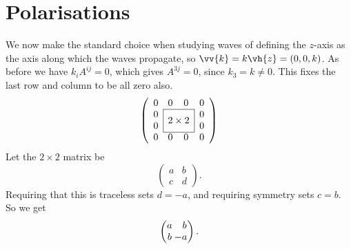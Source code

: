 \documentclass[fleqn]{NotesClass}
\begin{document}
    \section{Polarisations}
    We now make the standard choice when studying waves of defining the \(z\)-axis as the axis along which the waves propagate, so \(\vv{k} = k\vh{z} = (0, 0, k)\).
    As before we have \(k_iA^{ij} = 0\), which gives \(A^{3j} = 0\), since \(k_3 = k \ne 0\).
    This fixes the last row and column to be all zero also.
    \begin{equation}
        \left(
        \begin{array}{cccc}
            0 & 0 & 0 & 0\\\cline{2-3}
            0 & \multicolumn{1}{|c}{} & \multicolumn{1}{c|}{} & 0\\
            0 & \multicolumn{1}{|c}{} &  \multicolumn{1}{c|}{\hspace{-1.5em}\smash{{\raisebox{1.3ex}{\(2\times 2\)}}}} & 0\\\cline{2-3}
            0 & 0 & 0 & 0\\
        \end{array}
        \right)
    \end{equation}
    Let the \(2\times 2\) matrix be
    \begin{equation}
        \begin{pmatrix}
            a & b\\
            c & d
        \end{pmatrix}
        .
    \end{equation}
    Requiring that this is traceless sets \(d = -a\), and requiring symmetry sets \(c = b\).
    So we get
    \begin{equation}
        \begin{pmatrix}
            a & b\\
            b & \mathllap{-}a
        \end{pmatrix}
        .
    \end{equation}
    
\end{document}
